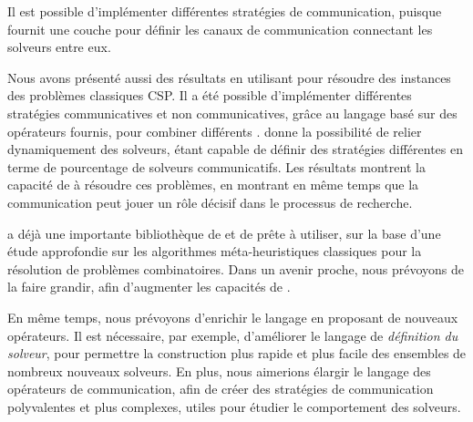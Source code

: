 Il est possible d'implémenter différentes stratégies de communication, puisque \posl{} fournit une couche pour définir les canaux de communication connectant les solveurs entre eux.

Nous avons présenté aussi des résultats en utilisant \posl{} pour résoudre des instances des problèmes classiques CSP. Il a été possible d'implémenter différentes stratégies communicatives et non communicatives, grâce au langage basé sur des opérateurs fournis, pour combiner différents \oms{}. \posl{} donne la possibilité de relier dynamiquement des solveurs, étant capable de définir des stratégies différentes en terme de pourcentage de solveurs communicatifs. Les résultats montrent la capacité de \posl{} à résoudre ces problèmes, en montrant en même temps que la communication peut jouer un rôle décisif dans le processus de recherche.

\posl{} a déjà une importante bibliothèque de \oms{} et de \opchs{} prête à utiliser, sur la base d'une étude approfondie sur les algorithmes méta-heuristiques classiques pour la résolution de problèmes combinatoires. Dans un avenir proche, nous prévoyons de la faire grandir, afin d'augmenter les capacités de \posl.

En même temps, nous prévoyons d'enrichir le langage en proposant de nouveaux opérateurs. Il est nécessaire, par exemple, d'améliorer le langage de {\it définition du solveur}, pour permettre la construction plus rapide et plus facile des ensembles de nombreux nouveaux solveurs. En plus, nous aimerions élargir le langage des opérateurs de communication, afin de créer des stratégies de communication polyvalentes et plus complexes, utiles pour étudier le comportement des solveurs.